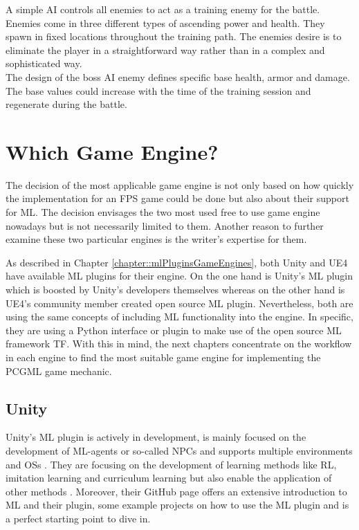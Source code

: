 \documentclass[MGS,Master,english]{twbook}%
\begin{document}
A simple AI controls all enemies to act as a training enemy for the battle. Enemies come in three different types of ascending power and health. They spawn in fixed locations throughout the training path. The enemies desire is to eliminate the player in a straightforward way rather than in a complex and sophisticated way. \\
The design of the boss AI enemy defines specific base health, armor and damage. The base values could increase with the time of the training session and regenerate during the battle.

\section{Which Game Engine?} \label{whichGameEngine}
The decision of the most applicable game engine is not only based on how quickly the implementation for an FPS game could be done but also about their support for ML. The decision envisages the two most used free to use game engine nowadays but is not necessarily limited to them. Another reason to further examine these two particular engines is the writer's expertise for them.

As described in Chapter \ref{chapter::mlPluginsGameEngines}, both Unity and UE4 have available ML plugins for their engine. On the one hand is Unity's ML plugin which is boosted by Unity’s developers themselves whereas on the other hand is UE4’s community member created open source ML plugin. Nevertheless, both are using the same concepts of including ML functionality into the engine. In specific, they are using a Python interface or plugin to make use of the open source ML framework \acf{TF}. With this in mind, the next chapters concentrate on the workflow in each engine to find the most suitable game engine for implementing the PCGML game mechanic.

\subsection{Unity}
Unity's ML plugin is actively in development, is mainly focused on the development of ML-agents or so-called \ac{NPC}s and supports multiple environments and \acp{OS} \cite{unity::mlGithub}. They are focusing on the development of learning methods like RL, imitation learning and curriculum learning but also enable the application of other methods \cite{unity::mlGithub}. Moreover, their GitHub page offers an extensive introduction to ML and their plugin, some example projects on how to use the ML plugin and is a perfect starting point to dive in. 
\end{document}
